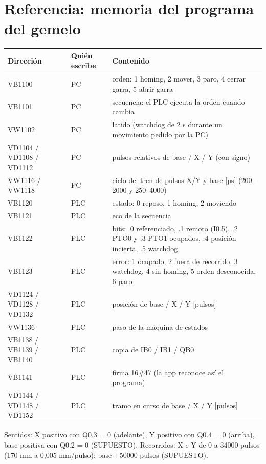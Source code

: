 \documentclass[a4paper,11pt]{article}
\begin{document}
\section{Referencia: memoria del programa del gemelo}
\begin{center}\small
\begin{longtable}{@{}p{4.3cm}p{2.1cm}p{9.6cm}@{}}
\toprule
\textbf{Dirección} & \textbf{Quién escribe} & \textbf{Contenido}\\
\midrule
VB1100 & PC & orden: 1 homing, 2 mover, 3 paro, 4 cerrar garra, 5 abrir garra\\
VB1101 & PC & secuencia: el PLC ejecuta la orden cuando cambia\\
VW1102 & PC & latido (watchdog de 2 s durante un movimiento pedido por la PC)\\
VD1104 / VD1108 / VD1112 & PC & pulsos relativos de base / X / Y (con signo)\\
VW1116 / VW1118 & PC & ciclo del tren de pulsos X/Y y base [µs] (200--2000 y 250--4000)\\
VB1120 & PLC & estado: 0 reposo, 1 homing, 2 moviendo\\
VB1121 & PLC & eco de la secuencia\\
VB1122 & PLC & bits: .0 referenciado, .1 remoto (I0.5), .2 PTO0 y .3 PTO1 ocupados, .4 posición incierta, .5 watchdog\\
VB1123 & PLC & error: 1 ocupado, 2 fuera de recorrido, 3 watchdog, 4 sin homing, 5 orden desconocida, 6 paro\\
VD1124 / VD1128 / VD1132 & PLC & posición de base / X / Y [pulsos]\\
VW1136 & PLC & paso de la máquina de estados\\
VB1138 / VB1139 / VB1140 & PLC & copia de IB0 / IB1 / QB0\\
VB1141 & PLC & firma 16\#47 (la app reconoce así el programa)\\
VD1144 / VD1148 / VD1152 & PLC & tramo en curso de base / X / Y [pulsos]\\
\bottomrule
\end{longtable}
\end{center}
Sentidos: X positivo con Q0.3 = 0 (adelante), Y positivo con Q0.4 = 0 (arriba), base positiva con Q0.2 = 0 (SUPUESTO). Recorridos: X e Y de 0 a 34000 pulsos (170 mm a 0,005 mm/pulso); base $\pm$50000 pulsos (SUPUESTO).
\end{document}
